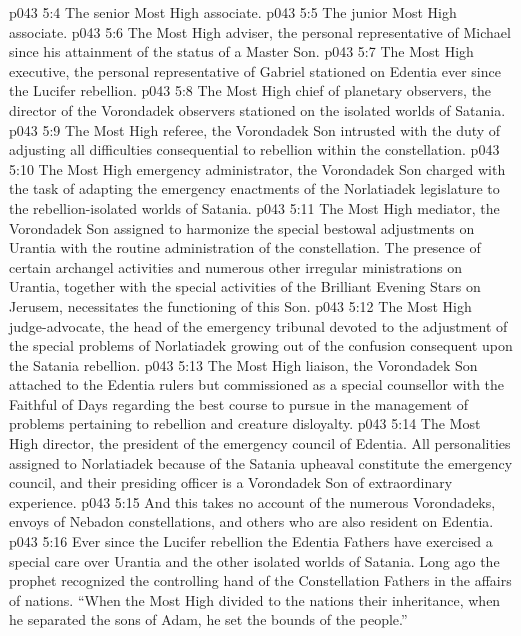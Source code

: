 \vs p043 5:4 \bibnobreakspace The senior Most High associate.
\vs p043 5:5 \bibnobreakspace The junior Most High associate.
\vs p043 5:6 \bibnobreakspace The Most High adviser, the personal representative of Michael since his attainment of the status of a Master Son.
\vs p043 5:7 \bibnobreakspace The Most High executive, the personal representative of Gabriel stationed on Edentia ever since the Lucifer rebellion.
\vs p043 5:8 \bibnobreakspace The Most High chief of planetary observers, the director of the Vorondadek observers stationed on the isolated worlds of Satania.
\vs p043 5:9 \bibnobreakspace The Most High referee, the Vorondadek Son intrusted with the duty of adjusting all difficulties consequential to rebellion within the constellation.
\vs p043 5:10 \bibnobreakspace The Most High emergency administrator, the Vorondadek Son charged with the task of adapting the emergency enactments of the Norlatiadek legislature to the rebellion\hyp{}isolated worlds of Satania.
\vs p043 5:11 \bibnobreakspace The Most High mediator, the Vorondadek Son assigned to harmonize the special bestowal adjustments on Urantia with the routine administration of the constellation. The presence of certain archangel activities and numerous other irregular ministrations on Urantia, together with the special activities of the Brilliant Evening Stars on Jerusem, necessitates the functioning of this Son.
\vs p043 5:12 \bibnobreakspace The Most High judge\hyp{}advocate, the head of the emergency tribunal devoted to the adjustment of the special problems of Norlatiadek growing out of the confusion consequent upon the Satania rebellion.
\vs p043 5:13 \bibnobreakspace The Most High liaison, the Vorondadek Son attached to the Edentia rulers but commissioned as a special counsellor with the Faithful of Days regarding the best course to pursue in the management of problems pertaining to rebellion and creature disloyalty.
\vs p043 5:14 \bibnobreakspace The Most High director, the president of the emergency council of Edentia. All personalities assigned to Norlatiadek because of the Satania upheaval constitute the emergency council, and their presiding officer is a Vorondadek Son of extraordinary experience.
\vs p043 5:15 And this takes no account of the numerous Vorondadeks, envoys of Nebadon constellations, and others who are also resident on Edentia.
\vs p043 5:16 \pc Ever since the Lucifer rebellion the Edentia Fathers have exercised a special care over Urantia and the other isolated worlds of Satania. Long ago the prophet recognized the controlling hand of the Constellation Fathers in the affairs of nations. “When the Most High divided to the nations their inheritance, when he separated the sons of Adam, he set the bounds of the people.”
